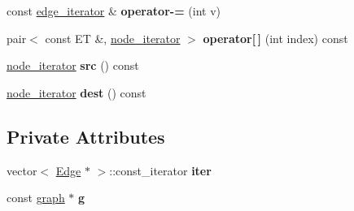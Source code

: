 \begin{DoxyCompactItemize}
\item 
\hypertarget{classgraph_1_1edge__iterator_aaf9399c6beae614ea25f0601b61717ad}{const \hyperlink{classgraph_1_1edge__iterator}{edge\+\_\+iterator} \& {\bfseries operator-\/=} (int v)}\label{classgraph_1_1edge__iterator_aaf9399c6beae614ea25f0601b61717ad}

\item 
\hypertarget{classgraph_1_1edge__iterator_aa37f36f86c3e59102bc4d79ab9b91a53}{pair$<$ const E\+T \&, \hyperlink{classgraph_1_1node__iterator}{node\+\_\+iterator} $>$ {\bfseries operator\mbox{[}$\,$\mbox{]}} (int index) const }\label{classgraph_1_1edge__iterator_aa37f36f86c3e59102bc4d79ab9b91a53}

\item 
\hypertarget{classgraph_1_1edge__iterator_a98a66e524bdfc1279aba7f8e04c18d33}{\hyperlink{classgraph_1_1node__iterator}{node\+\_\+iterator} {\bfseries src} () const }\label{classgraph_1_1edge__iterator_a98a66e524bdfc1279aba7f8e04c18d33}

\item 
\hypertarget{classgraph_1_1edge__iterator_a2c9de7b09212f35c31308dee010c507d}{\hyperlink{classgraph_1_1node__iterator}{node\+\_\+iterator} {\bfseries dest} () const }\label{classgraph_1_1edge__iterator_a2c9de7b09212f35c31308dee010c507d}

\end{DoxyCompactItemize}
\subsection*{Private Attributes}
\begin{DoxyCompactItemize}
\item 
\hypertarget{classgraph_1_1edge__iterator_a1a0a3fa0e4cd5ed6bb1304683a4ed3b0}{vector$<$ \hyperlink{structgraph_1_1Edge}{Edge} $\ast$ $>$\+::const\+\_\+iterator {\bfseries iter}}\label{classgraph_1_1edge__iterator_a1a0a3fa0e4cd5ed6bb1304683a4ed3b0}

\item 
\hypertarget{classgraph_1_1edge__iterator_a4232246807cc9b097f9c5196cc1e4ae5}{const \hyperlink{classgraph}{graph} $\ast$ {\bfseries g}}\label{classgraph_1_1edge__iterator_a4232246807cc9b097f9c5196cc1e4ae5}

\end{DoxyCompactItemize}
